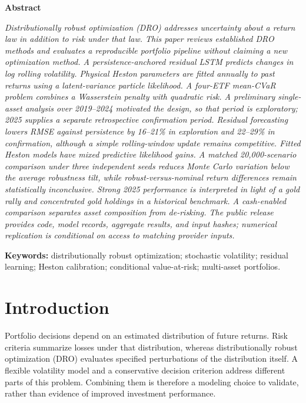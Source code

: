 \begin{center}\large\bfseries Abstract\end{center}
\noindent\textit{Distributionally robust optimization (DRO) addresses uncertainty about a return law in addition to risk under that law. This paper reviews established DRO methods and evaluates a reproducible portfolio pipeline without claiming a new optimization method. A persistence-anchored residual LSTM predicts changes in log rolling volatility. Physical Heston parameters are fitted annually to past returns using a latent-variance particle likelihood. A four-ETF mean-CVaR problem combines a Wasserstein penalty with quadratic risk. A preliminary single-asset analysis over 2019--2024 motivated the design, so that period is exploratory; 2025 supplies a separate retrospective confirmation period. Residual forecasting lowers RMSE against persistence by 16--21\% in exploration and 22--29\% in confirmation, although a simple rolling-window update remains competitive. Fitted Heston models have mixed predictive likelihood gains. A matched 20,000-scenario comparison under three independent seeds reduces Monte Carlo variation below the average robustness tilt, while robust-versus-nominal return differences remain statistically inconclusive. Strong 2025 performance is interpreted in light of a gold rally and concentrated gold holdings in a historical benchmark. A cash-enabled comparison separates asset composition from de-risking. The public release provides code, model records, aggregate results, and input hashes; numerical replication is conditional on access to matching provider inputs.}
\par\vspace{7pt}
\noindent\textbf{Keywords:} distributionally robust optimization; stochastic volatility; residual learning; Heston calibration; conditional value-at-risk; multi-asset portfolios.

\section{Introduction}
Portfolio decisions depend on an estimated distribution of future returns. Risk criteria summarize losses under that distribution, whereas distributionally robust optimization (DRO) evaluates specified perturbations of the distribution itself. A flexible volatility model and a conservative decision criterion address different parts of this problem. Combining them is therefore a modeling choice to validate, rather than evidence of improved investment performance.

